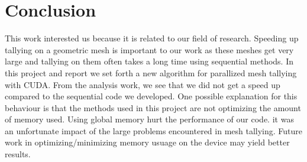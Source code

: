 \section{Conclusion}
This work interested us because it is related to our field of 
research. Speeding up tallying on a geometric mesh is important to our work 
as these meshes get very large and tallying on them often takes a long time
using sequential methods. In this project and report we set
forth a new algorithm for parallized mesh tallying with CUDA. 
From the analysis work, we see that we did not get a speed up compared 
to the sequential code we developed. One possible explanation for this 
behaviour is that the methods used in this project are not optimizing 
the amount of memory used. Using global memory hurt the performance of our code.
it was an unfortunate impact of the large problems encountered in mesh tallying.
Future work in optimizing/minimizing memory usuage on the device may yield
better results.
